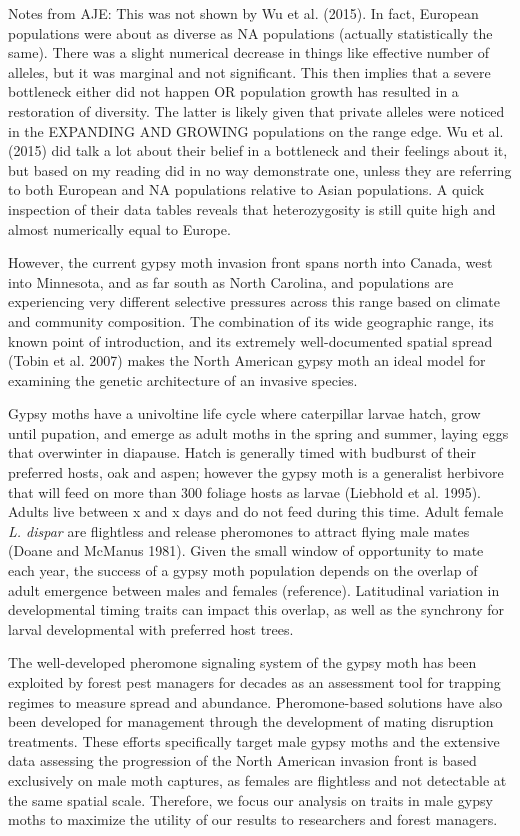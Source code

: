 \documentclass[smallextended]{svjour3}
\begin{document}
Notes from AJE: This was not shown by Wu et al. (2015). In fact, European
populations were about as diverse as NA populations (actually statistically  the
same). There was a slight numerical decrease in things like effective number of
alleles, but it was marginal and not significant.  This then implies that a
severe bottleneck either did not happen OR population growth has resulted in a
restoration of diversity. The latter is likely given that private alleles were
noticed in the EXPANDING AND GROWING populations on the range edge.  Wu et al.
(2015) did talk a lot about their belief in a bottleneck and their feelings
about it, but based on my reading did in no way demonstrate one, unless they are
referring to both European and NA populations relative to Asian populations. A
quick inspection of their data tables reveals that heterozygosity is still quite
high and almost numerically equal to Europe.

However, the current gypsy moth invasion front spans north into Canada, west
into Minnesota, and as far south as North Carolina, and populations are
experiencing very different selective pressures across this range based on
climate and community composition. The combination of its wide geographic range,
its known point of introduction, and its extremely well-documented spatial
spread (Tobin et al. 2007) makes the North American gypsy moth an ideal model
for examining the genetic architecture of an invasive species.

Gypsy moths have a univoltine life cycle where caterpillar larvae hatch, grow
until pupation, and emerge as adult moths in the spring and summer, laying eggs
that overwinter in diapause. Hatch is generally timed with budburst of their
preferred hosts, oak and aspen; however the gypsy moth is a generalist herbivore
that will feed on more than 300 foliage hosts as larvae (Liebhold et al. 1995).
Adults live between x and x days and do not feed during this time. Adult female
\textit{L. dispar} are flightless and release pheromones to attract flying male
mates (Doane and McManus 1981). Given the small window of opportunity to mate
each year, the success of a gypsy moth population depends on the overlap of adult
emergence between males and females (reference). Latitudinal variation in
developmental timing traits can impact this overlap, as well as the synchrony
for larval developmental with preferred host trees.

The well-developed pheromone signaling system of the gypsy moth has been
exploited by forest pest managers for decades as an assessment tool for trapping
regimes to measure spread and abundance. Pheromone-based solutions have also
been developed for management through the development of mating disruption
treatments. These efforts specifically target male gypsy moths and the extensive
data assessing the progression of the North American invasion front is based
exclusively on male moth captures, as females are flightless and not detectable
at the same spatial scale. Therefore, we focus our analysis on traits in male
gypsy moths to maximize the utility of our results to researchers and forest
managers.
\end{document}
